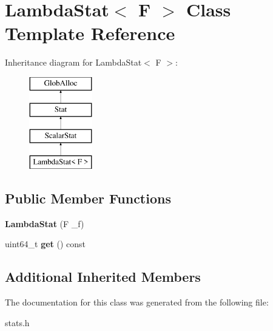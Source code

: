 \hypertarget{classLambdaStat}{\section{Lambda\-Stat$<$ F $>$ Class Template Reference}
\label{classLambdaStat}
}
Inheritance diagram for Lambda\-Stat$<$ F $>$\-:\begin{figure}[H]
\begin{center}
\leavevmode
\includegraphics[height=4.000000cm]{classLambdaStat}
\end{center}
\end{figure}
\subsection*{Public Member Functions}
\begin{DoxyCompactItemize}
\item 
\hypertarget{classLambdaStat_a44cd3edc94f7eb6988cde776471162af}{{\bfseries Lambda\-Stat} (F \-\_\-f)}\label{classLambdaStat_a44cd3edc94f7eb6988cde776471162af}

\item 
\hypertarget{classLambdaStat_a2d4a7954b0b878035202182cb1b8d2db}{uint64\-\_\-t {\bfseries get} () const }\label{classLambdaStat_a2d4a7954b0b878035202182cb1b8d2db}

\end{DoxyCompactItemize}
\subsection*{Additional Inherited Members}


The documentation for this class was generated from the following file\-:\begin{DoxyCompactItemize}
\item 
stats.\-h\end{DoxyCompactItemize}
